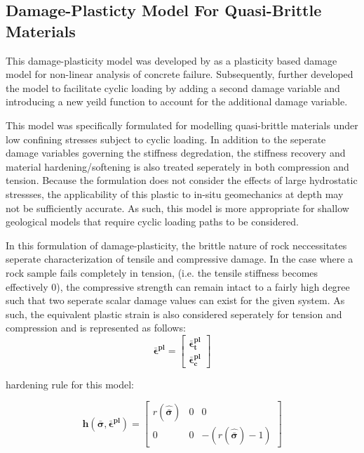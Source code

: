 \subsection{Damage-Plasticty Model For Quasi-Brittle Materials}

This damage-plasticity model was developed by \citet{lubliner_plastic-damage_1989}
as a plasticity based damage model for non-linear analysis of concrete
failure. Subsequently, \citet{lee_plastic-damage_1998} further developed the
model to facilitate cyclic loading by adding a second damage variable
and introducing a new yeild function to account for the additional
damage variable. 

This model was specifically formulated for modelling quasi-brittle
materials under low confining stresses subject to cyclic loading.
In addition to the seperate damage variables governing the stiffness
degredation, the stiffness recovery and material hardening/softening
is also treated seperately in both compression and tension. Because
the formulation does not consider the effects of large hydrostatic
stressses, the applicability of this plastic to in-situ geomechanics
at depth may not be sufficiently accurate. As such, this model is
more appropriate for shallow geological models that require cyclic
loading paths to be considered. 

In this formulation of damage-plasticity, the brittle nature of rock
neccessitates seperate characterization of tensile and compressive
damage. In the case where a rock sample fails completely in tension,
(i.e. the tensile stiffness becomes effectively 0), the compressive
strength can remain intact to a fairly high degree such that two seperate
scalar damage values can exist for the given system. As such, the
equivalent plastic strain is also considered seperately for tension
and compression and is represented as follows: 
\begin{equation}
\boldsymbol{\bar{\epsilon}^{pl}}=\begin{bmatrix}\boldsymbol{\bar{\epsilon}_{t}^{pl}}\\
\boldsymbol{\bar{\epsilon}_{c}^{pl}}
\end{bmatrix}\label{eqn:const9}
\end{equation}


hardening rule for this model:

\begin{equation}
\mathbf{h}\left(\boldsymbol{\bar{\sigma}},\boldsymbol{\bar{\epsilon}^{pl}}\right)=\left[\begin{array}{ccc}
r\left(\boldsymbol{\hat{\bar{\sigma}}}\right) & 0 & 0\\
0 & 0 & -\left(r\left(\boldsymbol{\hat{\bar{\sigma}}}\right)-1\right)
\end{array}\right]\label{eqn:const9-1}
\end{equation}

